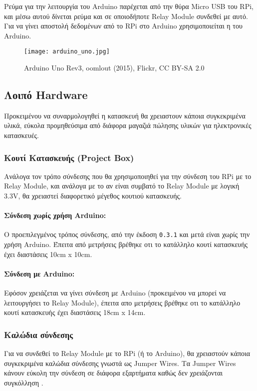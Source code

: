 		Ρεύμα για την λειτουργία του Arduino παρέχεται από την θύρα Micro USB του RPi, και μέσω αυτού δίνεται ρεύμα και σε οποιοδήποτε Relay Module συνδεθεί με αυτό. Για να γίνει αποστολή δεδομένων από το RPi στο Arduino χρησιμοποιείται η  του Arduino.

		\begin{figure}[h]
			\centering
				\texttt{[image: arduino\_uno.jpg]}
			\caption{Arduino Uno Rev3, oomlout (2015), Flickr, CC BY-SA 2.0}
		\end{figure}

	\subsection{Λοιπό Hardware}
		Προκειμένου να συναρμολογηθεί η κατασκευή θα χρειαστουν κάποια συγκεκριμένα υλικά, εύκολα προμηθεύσιμα από διάφορα μαγαζιά πώλησης υλικών για ηλεκτρονικές κατασκευές.

		\subsubsection{Κουτί Κατασκευής (Project Box)}
			Ανάλογα τον τρόπο σύνδεσης που θα χρησιμοποιηθεί για την σύνδεση του RPi με το Relay Module, και ανάλογα με το αν είναι συμβατό το Relay Module με λογική 3.3V, θα χρειαστεί διαφορετικό μέγεθος κουτιού κατασκευής. 

			\paragraph{Σύνδεση χωρίς χρήση Arduino:}
				Ο προεπιλεγμένος τρόπος σύνδεσης, από την έκδοση \verb|0.3.1| και μετά είναι χωρίς την χρήση Arduino. Έπειτα από μετρήσεις βρέθηκε οτι το κατάλληλο κουτί κατασκευής έχει διαστάσεις 10cm x 10cm.
			\paragraph{Σύνδεση με Arduino:}
				Εφόσον χρειάζεται να γίνει σύνδεση με Arduino (προκειμένου να μπορεί να λειτουργήσει το Relay Module), έπειτα απο μετρήσεις βρέθηκε οτι το κατάλληλο κουτί κατασκευής έχει διαστάσεις 18cm x 14cm.

		\subsubsection{Καλώδια σύνδεσης}
			Για να συνδεθεί το Relay Module με το RPi (ή το Arduino), θα χρειαστούν κάποια συγκεκριμένα καλώδια σύνδεσης γνωστά ως Jumper Wires. Τα Jumper Wires κάνουν εύκολη την σύνδεση σε διάφορα εξαρτήματα καθώς δεν χρειάζονται συγκόλληση \textsuperscript{\cite{jumper_wires}}.

